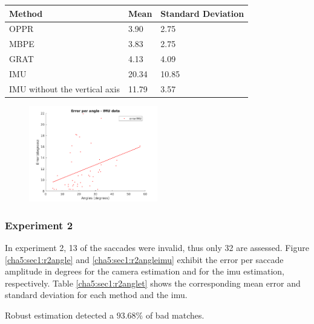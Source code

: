 \begin{table}[ht]
	\centering
\begin{tabular}{| l | l | l |}
	\hline
	Method & Mean & Standard Deviation \\
	\hline
	OPPR &  3.90 \degree & 2.75 \degree \\
	\hline
	MBPE &  3.83 \degree & 2.75 \degree \\
	\hline
	GRAT &  4.13 \degree & 4.09 \degree \\ 
	\hline
	IMU &  20.34 \degree & 10.85 \degree \\ 
	\hline
	IMU without the vertical axis &  11.79 \degree & 3.57 \degree \\ 
	\hline
\end{tabular}
\label{cha5:sec1:r1anglet}
\end{table}

\begin{figure}[ht]
	\centering
	\includegraphics[width=0.5\textwidth]{images/sim/imuerrorissue.png}
	\label{cha5:sec1:imuerrorissue}
\end{figure}


\subsubsection{Experiment 2}
In experiment 2, 13 of the saccades were invalid, thus only 32 are  assessed. Figure \ref{cha5:sec1:r2angle} and \ref{cha5:sec1:r2angleimu} exhibit the error per saccade amplitude in degrees for the camera estimation and for the \acrshort{imu} estimation, respectively. Table \ref{cha5:sec1:r2anglet} shows the corresponding mean error and standard deviation for each method and the \acrshort{imu}.

Robust estimation detected a $ 93.68 \%$ of bad matches.

